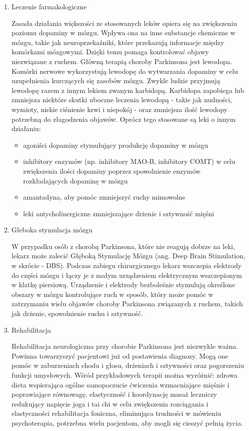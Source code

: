 \renewcommand{\labelenumi}{\alph{enumi})}
\begin{enumerate}
	\item Leczenie farmakologiczne

Zasada działania większości ze stosowanych leków opiera się na zwiększeniu poziomu dopaminy w mózgu.
Wpływa ona na inne substancje chemiczne w mózgu, takie jak neuroprzekaźniki, które przekazują informacje między komórkami mózgowymi.
Dzięki temu pomaga kontrolować objawy niezwiązane z ruchem.
Główną terapią choroby Parkinsona jest lewodopa.
Komórki nerwowe wykorzystują lewodopę do wytwarzania dopaminy w celu uzupełnienia kurczących się zasobów mózgu.
Zwykle ludzie przyjmują lewodopę razem z innym lekiem zwanym karbidopą.
Karbidopa zapobiega lub zmniejsza niektóre skutki uboczne leczenia lewodopą - takie jak nudności, wymioty, niskie ciśnienie
krwi i niepokój - oraz zmniejsza ilość lewodopy potrzebną do złagodzenia objawów.
Oprócz tego stosowane są leki o innym działaniu:

\begin{itemize}[itemsep=0.5pt]
	\item agoniści dopaminy stymulujący produkcję dopaminy w mózgu
	\item inhibitory enzymów (np. inhibitory MAO-B, inhibitory COMT) w celu zwiększenia ilości dopaminy poprzez spowolnienie enzymów rozkładających dopaminę w mózgu
	\item amantadyna, aby pomóc zmniejszyć ruchy mimowolne
	\item leki antycholinergiczne zmniejszające drżenie i sztywność mięśni
\end{itemize}


	\item Głeboka stymulacja mózgu
	
W przypadku osób z chorobą Parkinsona, które nie reagują dobrze na leki, lekarz może zalecić Głęboką Stymulację Mózgu (ang. Deep Brain Stimulation, w skrócie - DBS). Podczas zabiegu chirurgicznego lekarz wszczepia elektrody do części mózgu i łączy je z małym urządzeniem elektrycznym wszczepionym w klatkę piersiową. Urządzenie i elektrody bezboleśnie stymulują określone obszary w mózgu kontrolujące ruch w sposób, który może pomóc w zatrzymaniu wielu objawów choroby Parkinsona związanych z ruchem, takich jak drżenie, spowolnienie ruchu i sztywność.

	\item Rehabilitacja

Rehabilitacja neurologiczna przy chorobie Parkinsona jest niezwykle ważna. Powinna towarzyszyć pacjentowi już od postawienia diagnozy.  Mogą one pomóc w zaburzeniach chodu i głosu, drżeniach i sztywności oraz pogorszeniu funkcji umysłowych. Wśród przykładowych terapii można wyróżnić:
zdrowa dieta wspierająca ogólne samopoczucie
ćwiczenia wzmacniające mięśnie i poprawiające równowagę, elastyczność i koordynację
masaż leczniczy redukujący napięcie
joga i tai chi w celu zwiększenia rozciągania i elastyczności
rehabilitacja foniczna, eliminująca trudności w mówieniu
psychoterapia, potrzebna wielu pacjentom, aby mogli się cieszyć pełnią życia.
\end{enumerate}

